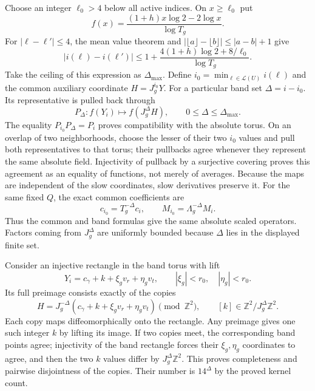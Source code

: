\documentclass[10pt,a4paper]{article}
\begin{document}
Choose an integer $\ell_0>4$ below all active indices.  On
$x\ge\ell_0$ put
\[
 f(x)=\frac{(1+h)x\log2-2\log x}{\log T_g}.
\]
For $|\ell-\ell'|\le4$, the mean value theorem and
$|\lfloor a\rfloor-\lfloor b\rfloor|\le |a-b|+1$ give
\[
 |i(\ell)-i(\ell')|
 \le1+\frac{4(1+h)\log2+8/\ell_0}{\log T_g}.
\]
Take the ceiling of this expression as $\Delta_{\max}$.  Define
$i_0=\min_{\ell\in\mathcal L(U)}i(\ell)$ and the common auxiliary
coordinate $H=J_g^{i_0}Y$.  For a particular band set $\Delta=i-i_0$.
Its representative is pulled back through
\[
 P_{\Delta}:f(Y_i)\longmapsto f(J_g^\Delta H),
 \qquad 0\le\Delta\le\Delta_{\max}.
\]
The equality $P_{i_0}P_\Delta=P_i$ proves compatibility with the
absolute torus.  On an overlap of two neighborhoods, choose the lesser
of their two $i_0$ values and pull both representatives to that torus;
their pullbacks agree whenever they represent the same absolute field.
Injectivity of pullback by a surjective covering proves this agreement
as an equality of functions, not merely of averages.  Because the maps
are independent of the slow coordinates, slow derivatives preserve it.
For the same fixed $Q$, the exact common coefficients are
\[
 c_{i_0}=T_g^{-\Delta}c_i,\qquad
 M_{i_0}=\Lambda_g^{-\Delta}M_i.
\]
Thus the common and band formulas give the same absolute scaled
operators.  Factors coming from $J_g^\Delta$ are uniformly bounded
because $\Delta$ lies in the displayed finite set.

Consider an injective rectangle in the band torus with lift
\[
 Y_i=c_\gamma+k+\xi_gv_r+\eta_gv_t,
 \qquad |\xi_g|<r_0,\quad |\eta_g|<r_0.
\]
Its full preimage consists exactly of the copies
\[
 H=J_g^{-\Delta}(c_\gamma+k+\xi_gv_r+\eta_gv_t)
       \pmod{\mathbb Z^2},\qquad
 [k]\in\mathbb Z^2/J_g^\Delta\mathbb Z^2.
\]
Each copy maps diffeomorphically onto the rectangle.  Any preimage
gives one such integer $k$ by lifting its image.  If two copies meet,
the corresponding band points agree; injectivity of the band
rectangle forces their $\xi_g,\eta_g$ coordinates to agree, and
then the two $k$ values differ by $J_g^\Delta\mathbb Z^2$.
This proves completeness and pairwise disjointness of the copies.
Their number is $14^\Delta$ by the proved kernel count.
\end{document}
